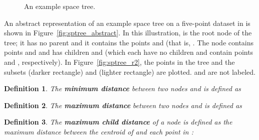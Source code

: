 \documentclass{article}
\newtheorem{defn}{Definition}
\begin{document}
\begin{figure}[t!]
{
     \label{fig:sptree_r2}
  }
  \vspace*{-1em}
  \caption{An example space tree.}
  \label{fig:sptree}
  \vspace*{-0.7em}
\end{figure}

An abstract representation of an example space tree on a five-point dataset in
 is shown in Figure~\ref{fig:sptree_abstract}.  In this illustration,
 is the root node of the tree; it has no parent and it contains
the points  and  (that is, .  The node
 contains points  and  and has children 
and  (which each have no children and contain points  and
, respectively).  In Figure~\ref{fig:sptree_r2}, the points in the tree and
the subsets  (darker rectangle) and  (lighter
rectangle) are plotted.  and  are not labeled.

\vspace*{0.5em}
\begin{defn}
The \textbf{minimum distance} between two nodes  and
 is defined as

\vspace*{-1.8em}

\end{defn}

\begin{defn}
The \textbf{maximum distance} between two nodes  and
 is defined as

\vspace*{-1.8em}

\end{defn}

\begin{defn}
The \textbf{maximum child distance} of a node  is defined as the
maximum distance between the centroid  of  and each point in
:

\vspace*{-1.2em}

\end{defn}
\end{document}
